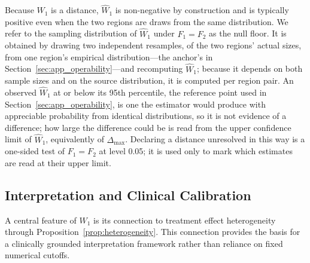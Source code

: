 \documentclass[AMA,Times1COL]{WileyNJDv5}
\begin{document}
Because $W_1$ is a distance, $\widehat{W}_1$ is non-negative by construction and is typically positive even when the two regions are draws from the same distribution. We refer to the sampling distribution of $\widehat{W}_1$ under $F_1 = F_2$ as the null floor. It is obtained by drawing two independent resamples, of the two regions' actual sizes, from one region's empirical distribution---the anchor's in Section~\ref{sec:app_operability}---and recomputing $\widehat{W}_1$; because it depends on both sample sizes and on the source distribution, it is computed per region pair. An observed $\widehat{W}_1$ at or below its 95th percentile, the reference point used in Section~\ref{sec:app_operability}, is one the estimator would produce with appreciable probability from identical distributions, so it is not evidence of a difference; how large the difference could be is read from the upper confidence limit of $\widehat{W}_1$, equivalently of $\Delta_{\max}$. Declaring a distance unresolved in this way is a one-sided test of $F_1 = F_2$ at level 0.05; it is used only to mark which estimates are read at their upper limit.

\subsection{Interpretation and Clinical Calibration}\label{sec:inference}

A central feature of $W_1$ is its connection to treatment effect heterogeneity through Proposition~\ref{prop:heterogeneity}. This connection provides the basis for a clinically grounded interpretation framework rather than reliance on fixed numerical cutoffs.
\end{document}
